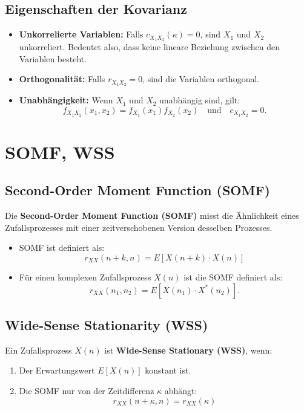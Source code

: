 \documentclass[12pt]{article}
\begin{document}
   \subsection*{Eigenschaften der Kovarianz}
      \begin{itemize}
         \item \textbf{Unkorrelierte Variablen:} Falls \( c_{X_1X_2}(\kappa) = 0 \), sind \( X_1 \) und \( X_2 \) unkorreliert. Bedeutet also, dass keine lineare Beziehung zwischen den Variablen besteht.
         \item \textbf{Orthogonalität:} Falls \( r_{X_1 X_2} = 0 \), sind die Variablen orthogonal.
         \item \textbf{Unabhängigkeit:} Wenn \( X_1 \) und \( X_2 \) unabhängig sind, gilt:
         \[
            f_{X_1 X_2}(x_1, x_2) = f_{X_1}(x_1) f_{X_2}(x_2) \quad \text{und} \quad c_{X_1 X_2} = 0.
         \]
      \end{itemize}

\newpage

\section{SOMF, WSS}
   \subsection{Second-Order Moment Function (SOMF)}
      Die \textbf{Second-Order Moment Function (SOMF)} misst die Ähnlichkeit eines Zufallsprozesses mit einer zeitverschobenen Version desselben Prozesses.

      \begin{itemize}
         \item SOMF ist definiert als: 
         \[
         r_{XX}(n+k, n) = E[X(n+k) \cdot X(n)]
         \]
         \item Für einen komplexen Zufallsprozess \( X(n) \) ist die SOMF definiert als:
         \[
         r_{XX}(n_1, n_2) = E[X(n_1) \cdot X^*(n_2)].
         \]
      \end{itemize}

   \subsection{Wide-Sense Stationarity (WSS)}
      Ein Zufallsprozess \( X(n) \) ist \textbf{Wide-Sense Stationary (WSS)}, wenn:
      \begin{enumerate}
         \item Der Erwartungswert \( E[X(n)] \) konstant ist.
         \item Die SOMF nur von der Zeitdifferenz \( \kappa \) abhängt:
         \[
         r_{XX}(n+\kappa, n) = r_{XX}(\kappa)
         \]
      \end{enumerate}
\end{document}
